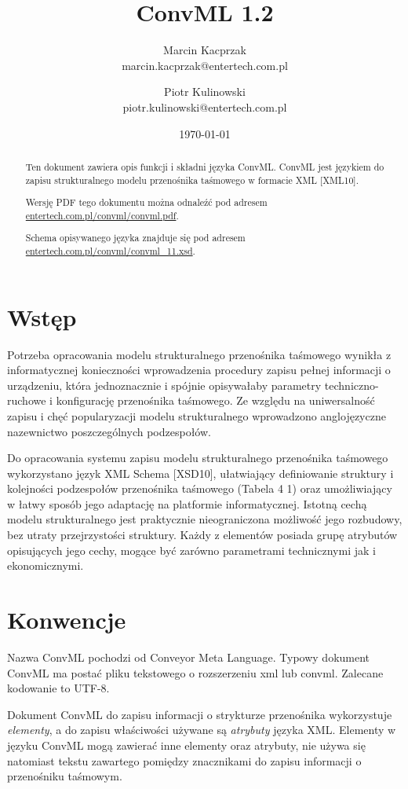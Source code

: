 \documentclass[12pt,a4paper]{article}
\title{ConvML 1.2}
\author{Marcin Kacprzak\\ marcin.kacprzak@entertech.com.pl\\
  \and Piotr Kulinowski\\ piotr.kulinowski@entertech.com.pl}
\date{\today}
\begin{document}
\maketitle

\begin{abstract}
  Ten dokument zawiera opis funkcji i składni języka ConvML.  ConvML jest językiem
  do zapisu strukturalnego modelu przenośnika taśmowego w formacie XML [XML10].

  Wersję PDF tego dokumentu można odnaleźć pod adresem
  \href{http://www.entertech.com.pl/convml/convml.pdf}{entertech.com.pl/convml/convml.pdf}.

  Schema opisywanego języka znajduje się pod adresem
  \href{http://www.entertech.com.pl/convml/convml\_11.xsd}{entertech.com.pl/convml/convml\_11.xsd}.
\end{abstract}

\tableofcontents


\section{Wstęp}
Potrzeba opracowania modelu strukturalnego przenośnika taśmowego wynikła z
informatycznej konieczności wprowadzenia procedury zapisu pełnej informacji o
urządzeniu, która jednoznacznie i spójnie opisywałaby parametry
techniczno-ruchowe i konfigurację przenośnika taśmowego.  Ze względu na
uniwersalność zapisu i chęć popularyzacji modelu strukturalnego wprowadzono
anglojęzyczne nazewnictwo poszczególnych podzespołów.

Do opracowania systemu zapisu modelu strukturalnego przenośnika taśmowego
wykorzystano język XML Schema [XSD10], ułatwiający definiowanie struktury i
kolejności podzespołów przenośnika taśmowego (Tabela 4 1) oraz umożliwiający w
łatwy sposób jego adaptację na platformie informatycznej.  Istotną cechą modelu
strukturalnego jest praktycznie nieograniczona możliwość jego rozbudowy, bez
utraty przejrzystości struktury.  Każdy z elementów posiada grupę atrybutów
opisujących jego cechy, mogące być zarówno parametrami technicznymi jak i
ekonomicznymi.


\section{Konwencje}
Nazwa ConvML pochodzi od Conveyor Meta Language.  Typowy dokument ConvML ma
postać pliku tekstowego o rozszerzeniu xml lub convml.  Zalecane kodowanie to
UTF-8.

Dokument ConvML do zapisu informacji o strykturze przenośnika wykorzystuje
\emph{elementy}, a do zapisu właściwości używane są \emph{atrybuty} języka XML.
Elementy w języku ConvML mogą zawierać inne elementy oraz atrybuty, nie używa
się natomiast tekstu zawartego pomiędzy znacznikami do zapisu informacji o
przenośniku taśmowym.
\end{document}
